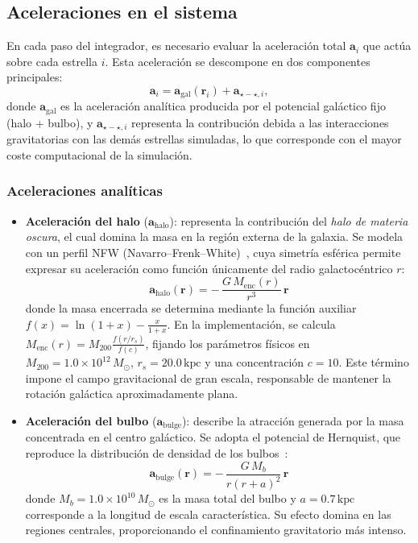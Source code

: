 \subsection{Aceleraciones en el sistema}\label{subsec:aceleraciones-en-el-sistema}
En cada paso del integrador, es necesario evaluar la aceleración total \(\mathbf{a}_i\) que actúa sobre cada estrella \(i\).
Esta aceleración se descompone en dos componentes principales:
\[
    \mathbf{a}_i = \mathbf{a}_{\mathrm{gal}}(\mathbf{r}_i) + \mathbf{a}_{\star-\star,i},
\]
donde \(\mathbf{a}_{\mathrm{gal}}\) es la aceleración analítica producida por el potencial galáctico fijo (halo + bulbo), y \(\mathbf{a}_{\star-\star,i}\) representa la contribución debida a las interacciones gravitatorias con las demás estrellas simuladas, lo que corresponde con el mayor coste computacional de la simulación.

\subsubsection{Aceleraciones analíticas}
\begin{itemize}
    \item \textbf{Aceleración del halo} (\(\mathbf{a}_{\mathrm{halo}}\)): representa la contribución del \emph{halo de materia oscura}, el cual domina la masa en la región externa de la galaxia.
    Se modela con un perfil NFW (Navarro–Frenk–White)~\cite{navarro1996}, cuya simetría esférica permite expresar su aceleración como función únicamente del radio galactocéntrico \(r\):
    \[
        \mathbf{a}_{\mathrm{halo}}(\mathbf{r}) = -\,\frac{G\,M_{\mathrm{enc}}(r)}{r^3}\,\mathbf{r}
    \]
    donde la masa encerrada se determina mediante la función auxiliar \(f(x) = \ln(1+x) - \frac{x}{1+x}\). En la implementación, se calcula \(M_{\mathrm{enc}}(r) = M_{200} \frac{f(r/r_s)}{f(c)}\), fijando los parámetros físicos en \(M_{200} = 1.0 \times 10^{12}\,M_{\odot}\), \(r_s = 20.0\,\mathrm{kpc}\) y una concentración \(c=10\).
    Este término impone el campo gravitacional de gran escala, responsable de mantener la rotación galáctica aproximadamente plana.

    \item \textbf{Aceleración del bulbo} (\(\mathbf{a}_{\mathrm{bulge}}\)): describe la atracción generada por la masa concentrada en el centro galáctico.
    Se adopta el potencial de Hernquist, que reproduce la distribución de densidad de los bulbos~\cite{hernquist1990}:
    \[
        \mathbf{a}_{\mathrm{bulge}}(\mathbf{r}) = -\,\frac{G\,M_b}{r(r+a)^2}\,\mathbf{r}
    \]
    donde \(M_b = 1.0 \times 10^{10}\,M_{\odot}\) es la masa total del bulbo y \(a = 0.7\,\mathrm{kpc}\) corresponde a la longitud de escala característica.
    Su efecto domina en las regiones centrales, proporcionando el confinamiento gravitatorio más intenso.
\end{itemize}
